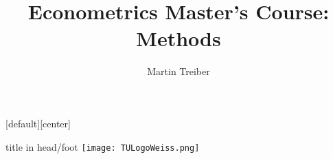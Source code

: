 
\usepackage[english]{babel}
\usepackage{pgf,pgfarrows,pgfnodes,pgfautomata,pgfheaps,pgfshade, hyperref,etex,pictex}
\usepackage{dsfont, bm, amsmath,amssymb, epsfig, graphicx,array,fancybox,}
\usepackage[latin1]{inputenc}
\usepackage[all]{xy}       %


[default][center]

\author{Martin Treiber}
\title{Econometrics Master's Course: Methods}

\renewcommand{\baselinestretch}{1}

\beamertemplatetransparentcovereddynamic
{}
\renewcommand{\arraystretch}{1}
 

\geometry{left=1cm, right=0.5cm}

\def\colorize<#1>{%
  \temporal<#1>{\color{structure}}{\color{black}}{\color{black}}}

\graphicspath{{./figures/}}



\newcommand{\frameofframes}{/}
\newcommand{\setframeofframes}[1]{\renewcommand{\frameofframes}{#1}}

\setframeofframes{of}
\makeatletter

{
    \begin{beamercolorbox}[ht=3ex,dp=1.125ex, leftskip=.3cm,rightskip=.3cm plus1fil]{title in head/foot}%
        \texttt{[image: TULogoWeiss.png]}
        \hspace{0.3cm}
        {\insertshorttitle}%
        \hfill%
        {\insertsection}
        \hfill%
        {\insertsubsectionhead}
    \end{beamercolorbox}
}



\newenvironment{beispiel}%
{{\color{mygreen}\textbf{Beispiel:} }\color{mygreen}}%
{}%

\newenvironment{beispiele}%
{{\color{mygreen}\textbf{Beispiele:} }\color{mygreen}}%
{}%


